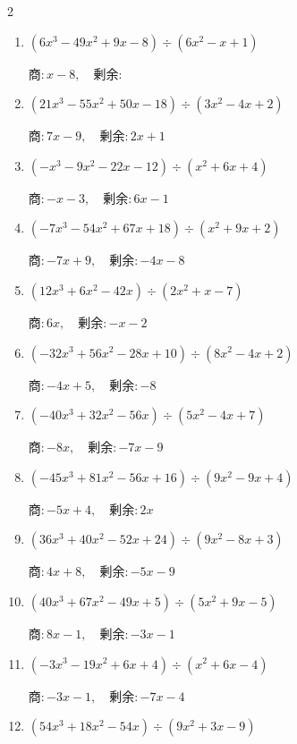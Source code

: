 \begin{multicols}{2}
\begin{enumerate}
        $商 : -9x+1, \quad 剰余 : -x-4$

  \item $(6x^{3}-49x^{2}+9x-8) \div (6x^{2}-x+1)$

        $商 : x-8, \quad 剰余 : $

  \item $(21x^{3}-55x^{2}+50x-18) \div (3x^{2}-4x+2)$

        $商 : 7x-9, \quad 剰余 : 2x+1$

\columnbreak %

  \item $(-x^{3}-9x^{2}-22x-12) \div (x^{2}+6x+4)$

        $商 : -x-3, \quad 剰余 : 6x-1$

  \item $(-7x^{3}-54x^{2}+67x+18) \div (x^{2}+9x+2)$

        $商 : -7x+9, \quad 剰余 : -4x-8$

  \item $(12x^{3}+6x^{2}-42x) \div (2x^{2}+x-7)$

        $商 : 6x, \quad 剰余 : -x-2$

  \item $(-32x^{3}+56x^{2}-28x+10) \div (8x^{2}-4x+2)$

        $商 : -4x+5, \quad 剰余 : -8$

  \item $(-40x^{3}+32x^{2}-56x) \div (5x^{2}-4x+7)$

        $商 : -8x, \quad 剰余 : -7x-9$

\columnbreak %

\resetques

  \item $(-45x^{3}+81x^{2}-56x+16) \div (9x^{2}-9x+4)$

        $商 : -5x+4, \quad 剰余 : 2x$

  \item $(36x^{3}+40x^{2}-52x+24) \div (9x^{2}-8x+3)$

        $商 : 4x+8, \quad 剰余 : -5x-9$

  \item $(40x^{3}+67x^{2}-49x+5) \div (5x^{2}+9x-5)$

        $商 : 8x-1, \quad 剰余 : -3x-1$

  \item $(-3x^{3}-19x^{2}+6x+4) \div (x^{2}+6x-4)$

        $商 : -3x-1, \quad 剰余 : -7x-4$

  \item $(54x^{3}+18x^{2}-54x) \div (9x^{2}+3x-9)$


\end{enumerate}
\end{multicols}
